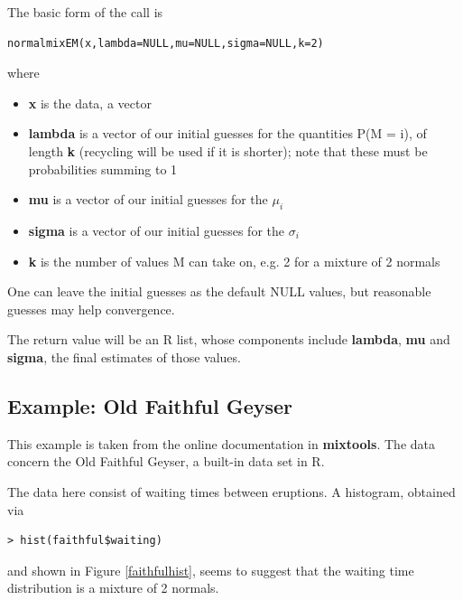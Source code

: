 The basic form of the call is 

\begin{lstlisting}
normalmixEM(x,lambda=NULL,mu=NULL,sigma=NULL,k=2)
\end{lstlisting}

where

\begin{itemize}

\item {\bf x} is the data, a vector

\item {\bf lambda} is a vector of our initial guesses for the quantities
P(M = i), of length {\bf k} (recycling will be used if it is shorter);
note that these must be probabilities summing to 1

\item {\bf mu} is a vector of our initial guesses for the $\mu_i$

\item {\bf sigma} is a vector of our initial guesses for the $\sigma_i$

\item {\bf k} is the number of values M can take on, e.g. 2 for a
mixture of 2 normals

\end{itemize}

One can leave the initial guesses as the default NULL values, but
reasonable guesses may help convergence.

The return value will be an R list, whose components include {\bf
lambda}, {\bf mu} and {\bf sigma}, the final estimates of those values.

\subsection{Example:  Old Faithful Geyser}

This example is taken from the online documentation in {\bf mixtools}.
The data concern the Old Faithful Geyser, a built-in data set in R.

The data here consist of waiting times between eruptions.  A histogram,
obtained via 

\begin{lstlisting}
> hist(faithful$waiting)
\end{lstlisting}

and shown in Figure \ref{faithfulhist}, seems to suggest that the
waiting time distribution is a mixture of 2 normals. 

